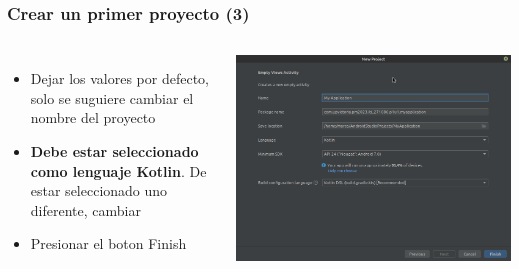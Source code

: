 \begin{frame}
\frametitle{Crear un primer proyecto (3)}  
\begin{columns}
\begin{itemize}
\item Dejar los valores por defecto, solo se suguiere cambiar el nombre del proyecto
\item \textbf{Debe estar seleccionado como lenguaje Kotlin}. De estar seleccionado uno diferente, cambiar
\item Presionar el boton Finish
\end{itemize}
\begin{center}
\includegraphics[width=0.95\linewidth]{00_PasosParaConfigurarSmartphoneModoDesarrollador/AndroidStudio03.png}    
\end{center}
\end{columns}
\end{frame}

